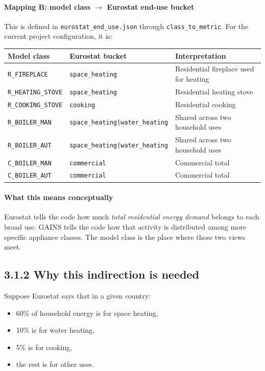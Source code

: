 \documentclass[11pt,a4paper]{article}
\begin{document}
\paragraph{Mapping B: model class $\rightarrow$ Eurostat end-use bucket}
This is defined in \texttt{eurostat\_end\_use.json} through \texttt{class\_to\_metric}.
For the current project configuration, it is:

\begin{center}
\begin{tabular}{lll}
\toprule
\textbf{Model class} & \textbf{Eurostat bucket} & \textbf{Interpretation} \\
\midrule
\texttt{R\_FIREPLACE} & \texttt{space\_heating} & Residential fireplace used for heating \\
\texttt{R\_HEATING\_STOVE} & \texttt{space\_heating} & Residential heating stove \\
\texttt{R\_COOKING\_STOVE} & \texttt{cooking} & Residential cooking \\
\texttt{R\_BOILER\_MAN} & \texttt{space\_heating|water\_heating} & Shared across two household uses \\
\texttt{R\_BOILER\_AUT} & \texttt{space\_heating|water\_heating} & Shared across two household uses \\
\texttt{C\_BOILER\_MAN} & \texttt{commercial} & Commercial total \\
\texttt{C\_BOILER\_AUT} & \texttt{commercial} & Commercial total \\
\bottomrule
\end{tabular}
\end{center}

\paragraph{What this means conceptually}
Eurostat tells the code how much \emph{total residential energy demand} belongs to
each broad use. GAINS tells the code how that activity is distributed among more
specific appliance classes. The model class is the place where those two views meet.

\subsection{3.1.2 Why this indirection is needed}

Suppose Eurostat says that in a given country:

\begin{itemize}[leftmargin=1.4em]
  \item 60\% of household energy is for space heating,
  \item 10\% is for water heating,
  \item 5\% is for cooking,
  \item the rest is for other uses.
\end{itemize}
\end{document}
